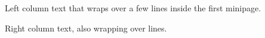 \documentclass[12pt]{article}
\begin{document}
\begin{minipage}{0.45\textwidth}Left column text that wraps over a few lines inside the first minipage.\end{minipage}\hfill
\begin{minipage}{0.45\textwidth}Right column text, also wrapping over lines.\end{minipage}
\end{document}
